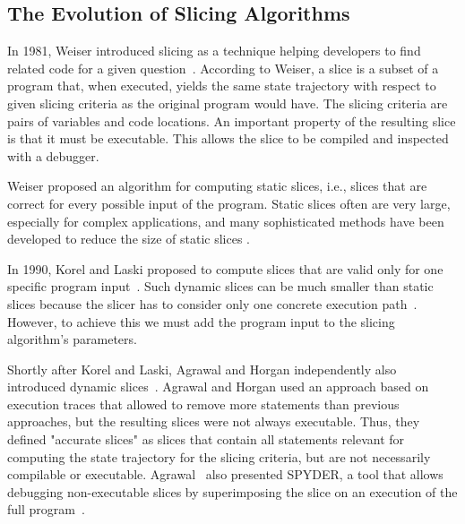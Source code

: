 \subsection{The Evolution of Slicing Algorithms}

In 1981, Weiser introduced slicing as a technique helping developers to find related code for a given question~\cite{weiser_81_program_slicing}.
According to Weiser, a slice is a subset of a program that, when executed, yields the same state trajectory with respect to given slicing criteria as the original program would have.
The slicing criteria are pairs of variables and code locations.
An important property of the resulting slice is that it must be executable.
This allows the slice to be compiled and inspected with a debugger.

Weiser proposed an algorithm for computing static slices, i.e., slices that are correct for every possible input of the program.
Static slices often are very large, especially for complex applications, and many sophisticated methods have been developed to reduce the size of static slices .

In 1990, Korel and Laski proposed to compute slices that are valid only for one specific program input~\cite{korel_88_dynamic_program_slicing}.
Such dynamic slices can be much smaller than static slices because the slicer has to consider only one concrete execution path~\cite{venkatesh_95_experimental_results_from_dynamica, hoffner_95_evaluation_and_comparison}.
However, to achieve this we must add the program input to the slicing algorithm's parameters.

Shortly after Korel and Laski, Agrawal and Horgan independently also introduced dynamic slices~\cite{agrawal_90_dynamic_program_slicing}.
Agrawal and Horgan used an approach based on execution traces that allowed to remove more statements than previous approaches, but the resulting slices were not always executable.
Thus, they defined "accurate slices" as slices that contain all statements relevant for computing the state trajectory for the slicing criteria, but are not necessarily compilable or executable.
Agrawal \etal\ also presented SPYDER, a tool that allows debugging non-executable slices by superimposing the slice on an execution of the full program~\cite{agrawal_93_debugging_with_dynamic_slicing}.

